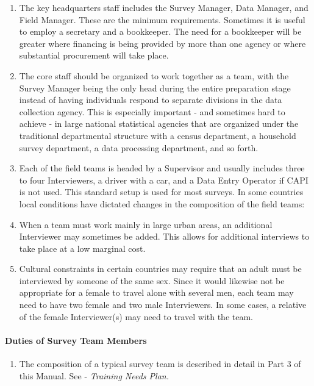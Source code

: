 \documentclass[
]{article}
\providecommand{\tightlist}{%
  \setlength{\itemsep}{0pt}\setlength{\parskip}{0pt}}
\begin{document}
\begin{enumerate}
\def\labelenumi{\arabic{enumi}.}
\setcounter{enumi}{363}
\item
  The key headquarters staff includes the Survey Manager, Data
  Manager, and Field Manager. These are the minimum requirements.
  Sometimes it is useful to employ a secretary and a bookkeeper. The
  need for a bookkeeper will be greater where financing is being
  provided by more than one agency or where substantial procurement
  will take place.
\item
  The core staff should be organized to work together as a team, with
  the Survey Manager being the only head during the entire preparation
  stage instead of having individuals respond to separate divisions in
  the data collection agency. This is especially important - and
  sometimes hard to achieve - in large national statistical agencies
  that are organized under the traditional departmental structure with
  a census department, a household survey department, a data
  processing department, and so forth.
\item
  Each of the field teams is headed by a Supervisor and usually
  includes three to four Interviewers, a driver with a car, and a Data
  Entry Operator if CAPI is not used. This standard setup is used for
  most surveys. In some countries local conditions have dictated
  changes in the composition of the field teams:
\item
  When a team must work mainly in large urban areas, an additional
  Interviewer may sometimes be added. This allows for additional
  interviews to take place at a low marginal cost.
\item
  Cultural constraints in certain countries may require that an adult
  must be interviewed by someone of the same sex. Since it would
  likewise not be appropriate for a female to travel alone with
  several men, each team may need to have two female and two male
  Interviewers. In some cases, a relative of the female Interviewer(s)
  may need to travel with the team.
\end{enumerate}

\hypertarget{duties-of-survey-team-members}{%
\paragraph{Duties of Survey Team Members}\label{duties-of-survey-team-members}}

\begin{enumerate}
\def\labelenumi{\arabic{enumi}.}
\setcounter{enumi}{368}
\tightlist
\item
  The composition of a typical survey team is described in detail in
  Part 3 of this Manual. See - \emph{Training Needs Plan.}
\end{enumerate}
\end{document}
